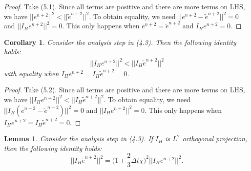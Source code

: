 \documentclass[10pt,a4paper]{amsart}
\newtheorem{corollary}{Corollary}[theorem]
\newtheorem{lemma}[theorem]{Lemma}
\begin{document}
\begin{proof}
    Take (5.1). Since all terms are positive and there are more terms on LHS, we have $||e^{n+2}||^2<||\tilde{e}^{n+2}||^2$. To obtain equality, we need $||e^{n+2}-\tilde{e}^{n+2}||^2=0$ and $||I_He^{n+2}||^2=0$. This only happens when $e^{n+2}=\tilde{e}^{n+2}$ and $I_He^{n+2}=0$.
\end{proof}

\begin{corollary}
    Consider the analysis step in (4.3). Then the following identity holds:
    \begin{align}
        ||I_He^{n+2}||^2< ||I_H\tilde{e}^{n+2}||^2
    \end{align}
    with equality when $I_He^{n+2}=I_H\tilde{e}^{n+2}=0$.
\end{corollary}

\begin{proof}
    Take (5.2). Since all terms are positive and there are more terms on LHS, we have $||I_He^{n+2}||^2<||I_H\tilde{e}^{n+2}||^2$. To obtain equality, we need $||I_H(e^{n+2}-\tilde{e}^{n+2})||^2=0$ and $||I_He^{n+2}||^2=0$. This only happens when $I_He^{n+2}=I_H\tilde{e}^{n+2}=0$.
\end{proof}

\begin{lemma}
    Consider the analysis step in (4.3). If $I_H$ is $L^2$ orthogonal projection, then the following identity holds:
    \begin{equation}
        ||I_H\tilde{e}^{n+2}||^2=\Bigg(1+\frac{2}{3}\Delta t\chi\Bigg)^2||I_He^{n+2}||^2.
    \end{equation}
\end{lemma}
\end{document}
